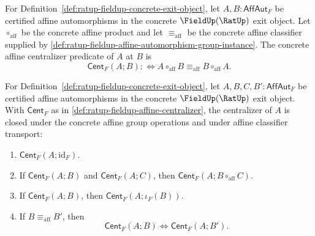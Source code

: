 \begin{definition}
\label{def:ratup-fieldup-affine-centralizer}
For Definition~\ref{def:ratup-fieldup-concrete-exit-object}, let
$A,B:\mathsf{AffAut}_F$ be certified affine automorphisms in the concrete
$\FieldUp(\RatUp)$ exit object. Let $\circ_{\mathrm{aff}}$ be the concrete
affine product and let $\equiv_{\mathrm{aff}}$ be the concrete affine
classifier supplied by
\autoref{def:ratup-fieldup-affine-automorphism-group-instance}. The concrete
affine centralizer predicate of $A$ at $B$ is
$$
\mathsf{Cent}_F(A;B)
:\Longleftrightarrow
A\circ_{\mathrm{aff}}B\equiv_{\mathrm{aff}}B\circ_{\mathrm{aff}}A.
$$
\end{definition}

\begin{theorem}
\label{thm:ratup-fieldup-affine-centralizer-product-inverse-closure}
For Definition~\ref{def:ratup-fieldup-concrete-exit-object}, let
$A,B,C,B':\mathsf{AffAut}_F$ be certified affine automorphisms in the concrete
$\FieldUp(\RatUp)$ exit object. With $\mathsf{Cent}_F$ as in
\autoref{def:ratup-fieldup-affine-centralizer}, the centralizer of $A$ is
closed under the concrete affine group operations and under affine classifier
transport:
\begin{enumerate}
\item $\mathsf{Cent}_F(A;\mathrm{id}_F)$.
\item If $\mathsf{Cent}_F(A;B)$ and $\mathsf{Cent}_F(A;C)$, then
$\mathsf{Cent}_F(A;B\circ_{\mathrm{aff}}C)$.
\item If $\mathsf{Cent}_F(A;B)$, then
$\mathsf{Cent}_F(A;\iota_F(B))$.
\item If $B\equiv_{\mathrm{aff}}B'$, then
$$
\mathsf{Cent}_F(A;B)\Longleftrightarrow\mathsf{Cent}_F(A;B').
$$
\end{enumerate}
\end{theorem}
